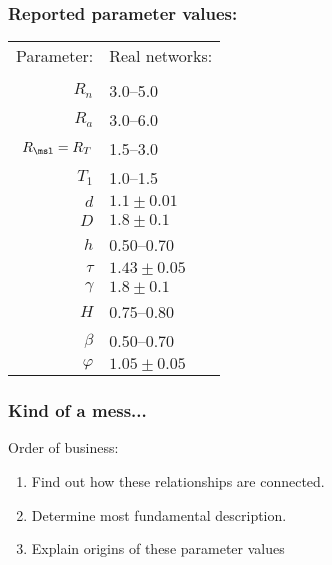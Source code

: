 \begin{frame}[label=]
  \frametitle{Reported parameter values:\cite{dodds1999a}}

  \settablerowcolours
  \begin{center}
    \begin{tabular}{rl}
      \alert{Parameter:}    & \alert{Real networks:}  \\
      &     \\
      $R_n$               & 3.0--5.0 \\
      $R_a$               & 3.0--6.0 \\
      $R_\msl=R_T$               & 1.5--3.0 \\
      $T_1$               & 1.0--1.5 \\
      ${d}$               & $1.1 \pm 0.01$ \\
      $D$                 & $1.8 \pm 0.1$ \\
      $h$                 & 0.50--0.70 \\
      $\tau$              & $1.43 \pm 0.05$ \\
      $\gamma$            & $1.8 \pm 0.1$ \\
      $H$                 & 0.75--0.80 \\
      $\beta$             & 0.50--0.70  \\
      $\varphi$           & $1.05 \pm 0.05$ \\
    \end{tabular}
  \end{center}

\end{frame}

\begin{frame}[label=]
  \frametitle{Kind of a mess...}

  \begin{block}{Order of business:}
    \begin{enumerate}
    \item<2-> Find out how these relationships are connected.
    \item<3-> Determine most fundamental description.
    \item<4-> Explain origins of these parameter values  \\
      \bigskip
    \end{enumerate}
  \end{block}

\end{frame}


